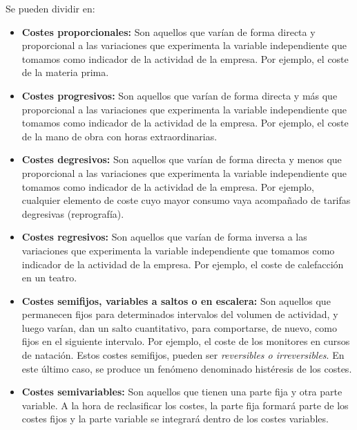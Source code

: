 \documentclass[12pt]{report} %
\begin{document}
\begin{definicion}
Se pueden dividir en:
\begin{itemize}
\item \textbf{Costes proporcionales:}  
  Son aquellos que varían de forma directa y proporcional a las variaciones que experimenta la variable independiente que tomamos como indicador de la actividad de la empresa. Por ejemplo, el coste de la materia prima.

\item \textbf{Costes progresivos: } 
  Son aquellos que varían de forma directa y más que proporcional a las variaciones que experimenta la variable independiente que tomamos como indicador de la actividad de la empresa. Por ejemplo, el coste de la mano de obra con horas extraordinarias.

\item \textbf{Costes degresivos: } 
  Son aquellos que varían de forma directa y menos que proporcional a las variaciones que experimenta la variable independiente que tomamos como indicador de la actividad de la empresa. Por ejemplo, cualquier elemento de coste cuyo mayor consumo vaya acompañado de tarifas degresivas (reprografía).

\item \textbf{Costes regresivos: } 
  Son aquellos que varían de forma inversa a las variaciones que experimenta la variable independiente que tomamos como indicador de la actividad de la empresa. Por ejemplo, el coste de calefacción en un teatro.

\item \textbf{Costes semifijos, variables a saltos o en escalera:}  
  Son aquellos que permanecen fijos para determinados intervalos del volumen de actividad, y luego varían, dan un salto cuantitativo, para comportarse, de nuevo, como fijos en el siguiente intervalo. Por ejemplo, el coste de los monitores en cursos de natación.  
  Estos costes semifijos, pueden ser \textit{reversibles o irreversibles}. En este último caso, se produce un fenómeno denominado histéresis de los costes.

\item \textbf{Costes semivariables: } 
  Son aquellos que tienen una parte fija y otra parte variable. A la hora de reclasificar los costes, la parte fija formará parte de los costes fijos y la parte variable se integrará dentro de los costes variables.


\end{itemize}
\end{definicion}
\end{document}
